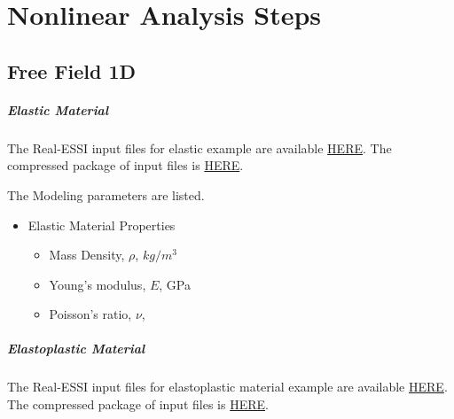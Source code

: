 \chapter{Nonlinear Analysis Steps}
\label{ch-nonlinear-analysis-steps}





\clearpage
\newpage
\section{Free Field 1D}
\label{free_field_1D}
\paragraph{Elastic Material}
The Real-ESSI input files for elastic example are available 
\href{https://github.com/yuan-energy/Real-ESSI-Short-Course-Examples/tree/master/short-course-examples/nonlinear_analysis_steps/free_field_1D/elastic}{HERE}. 
The compressed package of input files is  
\href{https://github.com/yuan-energy/Real-ESSI-Short-Course-Examples/tree/master/short-course-examples/nonlinear_analysis_steps/free_field_1D/elastic/elastic.tgz?raw=true}{HERE}. 


The Modeling parameters are listed.
\begin{itemize}
  \item Elastic Material Properties 
  \begin{itemize}
    \item Mass Density, $\rho$, \enspace {} $kg/m^3$
    \item Young's modulus, $E$, \enspace {} GPa
    \item Poisson's ratio, $\nu$, \enspace {}
  \end{itemize}
\end{itemize}





\paragraph{Elastoplastic Material}
The Real-ESSI input files for elastoplastic material example are available 
\href{https://github.com/yuan-energy/Real-ESSI-Short-Course-Examples/tree/master/short-course-examples/nonlinear_analysis_steps/free_field_1D/elastoplastic}{HERE}. 
The compressed package of input files is  
\href{https://github.com/yuan-energy/Real-ESSI-Short-Course-Examples/tree/master/short-course-examples/nonlinear_analysis_steps/free_field_1D/elastoplastic/elastoplastic.tgz?raw=true}{HERE}. 

